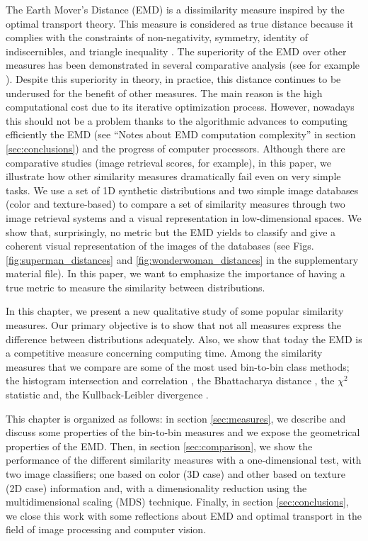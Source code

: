 The Earth Mover's Distance (EMD) \citep{Rubner.Tomasi.ea:IJCV:2000} is a dissimilarity measure inspired by the optimal transport theory. This measure is considered as true distance because it complies with the constraints of non-negativity, symmetry, identity of indiscernibles, and triangle inequality \citep{Peyre.Cuturi:arXiv:2018}. The superiority of the EMD over other measures has been demonstrated in several comparative analysis (see for example \citep{Puzicha.Buhmann.ea:ICCV:1999, Rubner.Tomasi.ea:IJCV:2000}). Despite this superiority in theory, in practice, this distance continues to be underused for the benefit of other measures. The main reason is the high computational cost due to its iterative optimization process. However, nowadays this should not be a problem thanks to the algorithmic advances to computing efficiently the EMD (see ``Notes about EMD computation complexity'' in section \ref{sec:conclusions}) and the progress of computer processors. Although there are comparative studies (image retrieval scores, for example), in this paper, we illustrate how other similarity measures dramatically fail even on very simple tasks. We use a set of 1D synthetic distributions and two simple image databases (color and texture-based) to compare a set of similarity measures through two image retrieval systems and a visual representation in low-dimensional spaces. We show that, surprisingly, no metric but the EMD yields to classify and give a coherent visual representation of the images of the databases (see Figs. \ref{fig:superman_distances} and \ref{fig:wonderwoman_distances} in the supplementary material file). In this paper, we want to emphasize the importance of having a true metric to measure the similarity between distributions.

In this chapter, we present a new qualitative study of some popular similarity measures. Our primary objective is to show that not all measures express the difference between distributions adequately. Also, we show that today the EMD is a competitive measure concerning computing time. Among the similarity measures that we compare are some of the most used bin-to-bin class methods; the histogram intersection and correlation \citep{Nejhum.Ho.ea:CVPR:2008}, the Bhattacharya distance \citep{So.Chung:JPR:2017}, the $\chi^2$ statistic and, the  Kullback-Leibler divergence \citep{Klein.Frintrop:CV:2011}. 

This chapter is organized as follows: in section \ref{sec:measures}, we describe and discuss some properties of the bin-to-bin measures and we expose the geometrical properties of the EMD. Then, in section \ref{sec:comparison}, we show the performance of the different similarity measures with a one-dimensional test, with two image classifiers; one based on color (3D case) and other based on texture (2D case) information and, with a dimensionality reduction using the multidimensional scaling (MDS) technique. Finally, in section \ref{sec:conclusions}, we close this work with some reflections about EMD and optimal transport in the field of image processing and computer vision.


